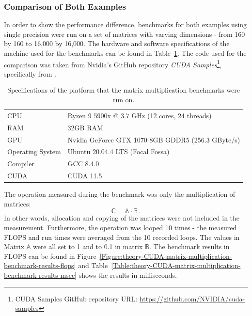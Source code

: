 \subsubsection{Comparison of Both Examples}\label{Subsubsection:matrix-multiplication-comparison-of-examples}
In order to show the performance difference, benchmarks for both examples using single precision were run on a set of matrices with varying dimensions - from 160 by 160 to 16,000 by 16,000. The hardware and software specifications of the machine used for the benchmarks can be found in Table~\ref{Table:theory-CUDA-matrix-multiplication-benchmark-system}. The code used for the comparison was taken from Nvidia's GitHub repository \textit{CUDA Samples}\footnote{CUDA Samples GitHub repository URL: \url{https://github.com/NVIDIA/cuda-samples}}, specifically from .

\begin{table}[h]
	\centering
	\begin{tabular}{|l|l|}
		\hline
		CPU              & Ryzen 9 5900x @ 3.7 GHz (12 cores, 24 threads) \\
		RAM              & 32GB RAM \\
		GPU              & Nvidia GeForce GTX 1070 8GB GDDR5 (256.3 GByte/s)\\
		Operating System & Ubuntu 20.04.4 LTS (Focal Fossa) \\
		Compiler         & GCC 8.4.0 \\
		CUDA             & CUDA 11.5 \\ \hline
	\end{tabular}
	\caption{Specifications of the platform that the matrix multiplication benchmarks were run on.}
	\label{Table:theory-CUDA-matrix-multiplication-benchmark-system}
\end{table}

The operation measured during the benchmark was only the multiplication of matrices:
$$ \mathbb{C} = \mathbb{A} \cdot \mathbb{B} \,. $$
In other words, allocation and copying of the matrices were not included in the measurement. Furthermore, the operation was looped 10 times - the measured FLOPS and run times were averaged from the 10 recorded loops. The values in Matrix $ \mathbb{A} $ were all set to 1 and to 0.1 in matrix $ \mathbb{B} $. The benchmark results in FLOPS can be found in Figure~\ref{Figure:theory-CUDA-matrix-multiplication-benchmark-results-flops} and Table~\ref{Table:theory-CUDA-matrix-multiplication-benchmark-results-msec} shows the results in milliseconds.


